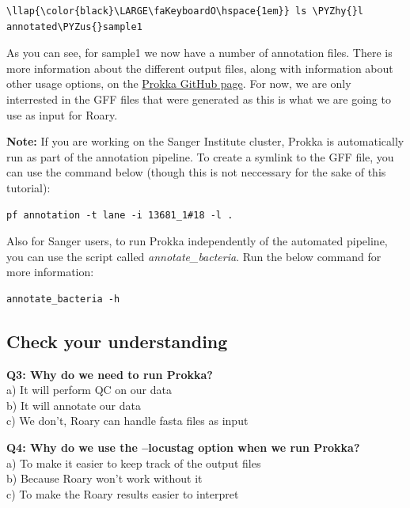 \documentclass[11pt]{article}
\def\PYZus{\char`\_}
\def\PYZhy{\char`\-}
\begin{document}
\begin{terminalinput}
\begin{Verbatim}[commandchars=\\\{\}]
\llap{\color{black}\LARGE\faKeyboardO\hspace{1em}} ls \PYZhy{}l annotated\PYZus{}sample1
\end{Verbatim}
\end{terminalinput}

    As you can see, for sample1 we now have a number of annotation files.
There is more information about the different output files, along with
information about other usage options, on the
\href{https://github.com/tseemann/prokka}{Prokka GitHub page}. For now,
we are only interrested in the GFF files that were generated as this is
what we are going to use as input for Roary.

\textbf{Note:} If you are working on the Sanger Institute cluster,
Prokka is automatically run as part of the annotation pipeline. To
create a symlink to the GFF file, you can use the command below (though
this is not neccessary for the sake of this tutorial):

\begin{verbatim}
pf annotation -t lane -i 13681_1#18 -l .
\end{verbatim}

Also for Sanger users, to run Prokka independently of the automated
pipeline, you can use the script called \textit{annotate\_bacteria}. Run
the below command for more information:

\begin{verbatim}
annotate_bacteria -h
\end{verbatim}

\hypertarget{check-your-understanding}{%
\subsection{Check your understanding}\label{check-your-understanding}}

\textbf{Q3: Why do we need to run Prokka?}\\
a) It will perform QC on our data\\
b) It will annotate our data\\
c) We don't, Roary can handle fasta files as input

\textbf{Q4: Why do we use the --locustag option when we run Prokka?}\\
a) To make it easier to keep track of the output files\\
b) Because Roary won't work without it\\
c) To make the Roary results easier to interpret
\end{document}
